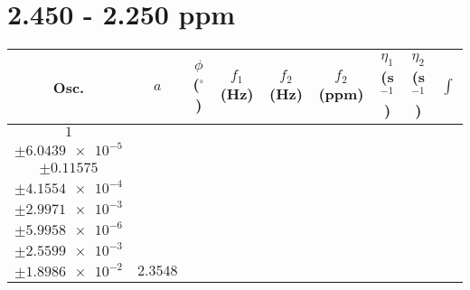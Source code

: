 \documentclass[8pt]{article}
\begin{document}
\section*{2.450 - 2.250 ppm}
\begin{longtable}[l]{c c c c c c c c c}
\toprule
Osc. & $a$ & $\phi$ ($^{\circ}$) & $f_1$ (Hz) & $f_2$ (Hz) & $f_2$ (ppm) & $\eta_1$ (s$^{-1}$) & $\eta_2$ (s$^{-1}$) & $\int$\\
\midrule
$\num{1}$ & \begin{tabular}[c]{@{}c@{}}$\num{3.0941e-2}$ \\ $\pm\num{6.0439e-5}$\end{tabular} & \begin{tabular}[c]{@{}c@{}}$\num{-0.44138}$ \\ $\pm\num{0.11575}$\end{tabular} & \begin{tabular}[c]{@{}c@{}}$\num{-11.394}$ \\ $\pm\num{4.1554e-4}$\end{tabular} & \begin{tabular}[c]{@{}c@{}}$\num{1.1684e+3}$ \\ $\pm\num{2.9971e-3}$\end{tabular} & \begin{tabular}[c]{@{}c@{}}$\num{2.3374}$ \\ $\pm\num{5.9958e-6}$\end{tabular} & \begin{tabular}[c]{@{}c@{}}$\num{1.1746}$ \\ $\pm\num{2.5599e-3}$\end{tabular} & \begin{tabular}[c]{@{}c@{}}$\num{4.2731}$ \\ $\pm\num{1.8986e-2}$\end{tabular} & $\num{2.3548}$\\

\end{longtable}
\end{document}
